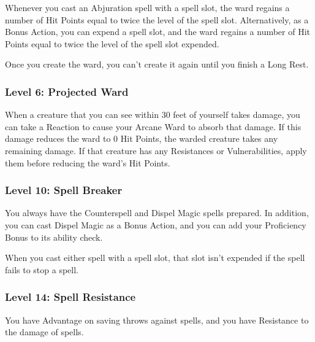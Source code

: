 \documentclass{article}
\begin{document}
Whenever you cast an Abjuration spell with a spell slot, the ward regains a number of Hit Points equal to twice the level of the spell slot. Alternatively, as a Bonus Action, you can expend a spell slot, and the ward regains a number of Hit Points equal to twice the level of the spell slot expended.

Once you create the ward, you can't create it again until you finish a Long Rest.

\vspace{1em}

\subsubsection*{ Level 6: Projected Ward }

When a creature that you can see within 30 feet of yourself takes damage, you can take a Reaction to cause your Arcane Ward to absorb that damage. If this damage reduces the ward to 0 Hit Points, the warded creature takes any remaining damage. If that creature has any Resistances or Vulnerabilities, apply them before reducing the ward's Hit Points.

\vspace{1em}

\subsubsection*{ Level 10: Spell Breaker }

You always have the Counterspell and Dispel Magic spells prepared. In addition, you can cast Dispel Magic as a Bonus Action, and you can add your Proficiency Bonus to its ability check.

When you cast either spell with a spell slot, that slot isn't expended if the spell fails to stop a spell.

\vspace{1em}

\subsubsection*{ Level 14: Spell Resistance }

You have Advantage on saving throws against spells, and you have Resistance to the damage of spells.

\vspace{1em}
\end{document}
